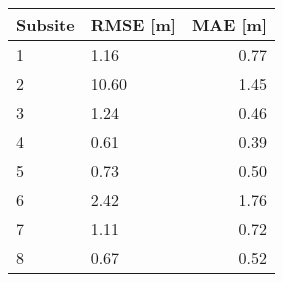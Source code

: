\begin{tabular}{lp{2cm}r}
\toprule
 Subsite & RMSE [m] & MAE [m] \\
\midrule
1 & 1.16 & 0.77 \\
2 & 10.60 & 1.45 \\
3 & 1.24 & 0.46 \\
4 & 0.61 & 0.39 \\
5 & 0.73 & 0.50 \\
6 & 2.42 & 1.76 \\
7 & 1.11 & 0.72 \\
8 & 0.67 & 0.52 \\
\bottomrule
\end{tabular}

